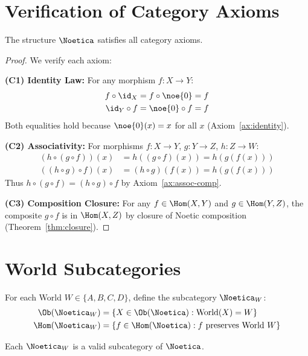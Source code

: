 \section{Verification of Category Axioms}

\begin{theorem}
\label{thm:noetica-category}
The structure $\Noetica$ satisfies all category axioms.
\end{theorem}

\begin{proof}
We verify each axiom:

\textbf{(C1) Identity Law:}
For any morphism $f : X \to Y$:
\begin{align}
f \circ \id_X &= f \circ \noe{0} = f \\
\id_Y \circ f &= \noe{0} \circ f = f
\end{align}
Both equalities hold because $\noe{0}(x) = x$ for all $x$ (Axiom~\ref{ax:identity}).

\textbf{(C2) Associativity:}
For morphisms $f : X \to Y$, $g : Y \to Z$, $h : Z \to W$:
\begin{align}
(h \circ (g \circ f))(x) &= h((g \circ f)(x)) = h(g(f(x))) \\
((h \circ g) \circ f)(x) &= (h \circ g)(f(x)) = h(g(f(x)))
\end{align}
Thus $h \circ (g \circ f) = (h \circ g) \circ f$ by Axiom~\ref{ax:assoc-comp}.

\textbf{(C3) Composition Closure:}
For any $f \in \Hom(X, Y)$ and $g \in \Hom(Y, Z)$, the composite $g \circ f$ is in $\Hom(X, Z)$ by closure of Noetic composition (Theorem~\ref{thm:closure}).
\end{proof}

\section{World Subcategories}

\begin{definition}
\label{def:world-subcat}
For each World $W \in \{A, B, C, D\}$, define the subcategory $\Noetica_W$:
\begin{align}
\Ob(\Noetica_W) &= \{X \in \Ob(\Noetica) : \mathrm{World}(X) = W\} \\
\Hom(\Noetica_W) &= \{f \in \Hom(\Noetica) : f \text{ preserves World } W\}
\end{align}
\end{definition}

\begin{proposition}
\label{prop:world-subcat}
Each $\Noetica_W$ is a valid subcategory of $\Noetica$.
\end{proposition}

